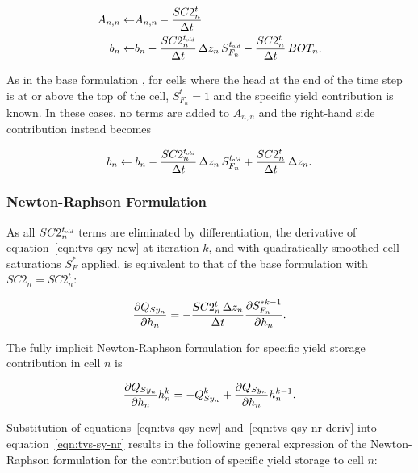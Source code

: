\begin{equation}
	\label{eqn:tvs-sy-Ab-std}
	\begin{aligned}
		A_{n,n} \leftarrow & A_{n,n} - \frac{SC2_n^t}{\Delta t} \\
		b_n \leftarrow & b_n - \frac{SC2_n^{t_\mathit{\kern -0.07em old}}}{\Delta t} \, \Delta z_n \, S_{F_n}^{t_\mathit{\kern -0.07em old}} - \frac{SC2_n^t}{\Delta t} \, BOT_n .
	\end{aligned}
\end{equation}

\noindent As in the base formulation \citep[Chapter 5]{modflow6gwf}, for cells where the head at the end of the time step is at or above the top of the cell, $S_{F_n}^t = 1$ and the specific yield contribution is known. In these cases, no terms are added to $A_{n,n}$ and the right-hand side contribution instead becomes

\begin{equation}
	\label{eqn:tvs-sy-b-fullsat}
	b_n \leftarrow b_n - \frac{SC2_n^{t_\mathit{\kern -0.07em old}}}{\Delta t} \, \Delta z_n \, S_{F_n}^{t_\mathit{\kern -0.07em old}} + \frac{SC2_n^t}{\Delta t} \, \Delta z_n .
\end{equation}


\subsubsection{Newton-Raphson Formulation}

As all $SC2_n^{t_\mathit{\kern -0.07em old}}$ terms are eliminated by differentiation, the derivative of equation~\ref{eqn:tvs-qsy-new} at iteration $k$, and with quadratically smoothed cell saturations $S_F^*$ applied, is equivalent to that of the base formulation \citep[eq. 5--14]{modflow6gwf} with $SC2_n = SC2_n^t$:

\begin{equation}
	\label{eqn:tvs-qsy-nr-deriv}
	\frac{\partial Q_{Sy_n}}{\partial h_n} = - \frac{SC2_n^t \, \Delta z_n}{\Delta t} \frac{\partial S_{F_n}^{\ast k-1}}{\partial h_n} .
\end{equation}

\noindent The fully implicit Newton-Raphson formulation for specific yield storage contribution in cell $n$ is

\begin{equation}
	\label{eqn:tvs-sy-nr}
	\frac{\partial Q_{Sy_n}}{\partial h_n} h_n^k = -Q_{Sy_n}^k + \frac{\partial Q_{Sy_n}}{\partial h_n} h_n^{k-1} .
\end{equation}

\noindent Substitution of equations~\ref{eqn:tvs-qsy-new} and~\ref{eqn:tvs-qsy-nr-deriv} into equation~\ref{eqn:tvs-sy-nr} results in the following general expression of the Newton-Raphson formulation for the contribution of specific yield storage to cell $n$:

